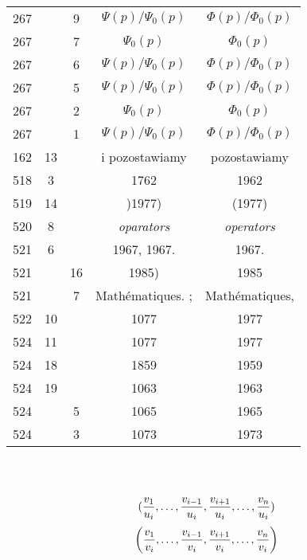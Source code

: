 \documentclass[a4paper,11pt]{article}
\begin{document}
\begin{center}
\begin{tabular}{|c|c|c|c|c|}
    267 & &  9 & $\Psi( p ) / \Psi_{ 0 }( p )$
           & $\Phi( p ) / \Phi_{ 0 }( p )$ \\
    267 & &  7 & $\Psi_{ 0 }( p )$ & $\Phi_{ 0 }( p )$ \\
    267 & &  6 & $\Psi( p ) / \Psi_{ 0 }( p )$
           & $\Phi( p ) / \Phi_{ 0 }( p )$ \\
    267 & &  5 & $\Psi( p ) / \Psi_{ 0 }( p )$
           & $\Phi( p ) / \Phi_{ 0 }( p )$ \\
    267 & &  2 & $\Psi_{ 0 }( p )$ & $\Phi_{ 0 }( p )$ \\
    267 & &  1 & $\Psi( p ) / \Psi_{ 0 }( p )$
           & $\Phi( p ) / \Phi_{ 0 }( p )$ \\
    162 & 13 & & i pozostawiamy & pozostawiamy \\
    518 &  3 & & 1762 & 1962 \\
    519 & 14 & & )1977) & (1977) \\
    520 &  8 & & \emph{oparators} & \emph{operators} \\
    521 &  6 & & 1967, 1967. & 1967. \\
    521 & & 16 & 1985) & 1985 \\
    521 & &  7 & Math\'{e}matiques. ; & Math\'{e}matiques, \\
    522 & 10 & & 1077 & 1977 \\
    524 & 11 & & 1077 & 1977 \\
    524 & 18 & & 1859 & 1959 \\
    524 & 19 & & 1063 & 1963 \\
    524 & &  5 & 1065 & 1965 \\
    524 & &  3 & 1073 & 1973 \\
    \hline
  \end{tabular}

\end{center}
\noi \\
 \\
\Jest %
\begin{equation*}
  ( \frac{ v_{ 1 } }{ u_{ i } }, \ldots, \frac{ v_{ i - 1 } }{ u_{ i } },
  \frac{ v_{ i + 1 } }{ u_{ i } }, \ldots, \frac{ v_{ n } }{ u_{ i } } )  
\end{equation*}
\Pow
\begin{equation*}
  \left( \frac{ v_{ 1 } }{ v_{ i } }, \ldots, \frac{ v_{ i - 1 } }{ v_{ i } },
    \frac{ v_{ i + 1 } }{ v_{ i } }, \ldots, \frac{ v_{ n } }{ v_{ i } } \right)  
\end{equation*}
\end{document}
